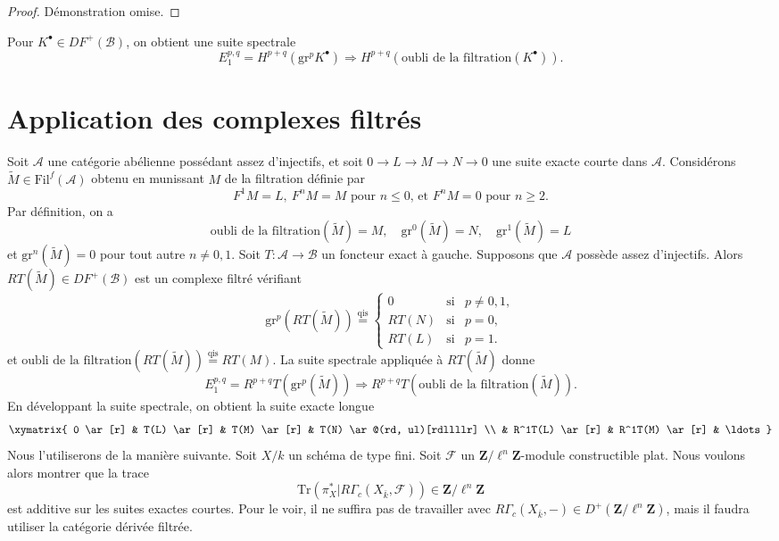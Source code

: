 \begin{proof}
Démonstration omise.
\end{proof}

\noindent
Pour $K^\bullet \in DF^+(\mathcal{B})$, on obtient une suite spectrale
$$
E_1^{p, q} = H^{p+q}(\text{gr}^p K^\bullet) \Rightarrow H^{p+q}(\text{oubli de la
filtration}(K^\bullet)).
$$






\section{Application des complexes filtrés}
\label{section-applications-filtered}

\noindent
Soit $\mathcal{A}$ une catégorie abélienne possédant assez d'injectifs, et soit
$0 \to L \to M \to N \to 0$ une suite exacte courte dans $\mathcal{A}$.
Considérons $\widetilde M \in \text{Fil}^f(\mathcal{A})$ obtenu en munissant $M$ de la
filtration définie par
$$
F^1M = L, \ F^nM = M
\text{ pour }n \leq 0\text{, et }F^nM = 0\text{ pour }n \geq 2.
$$
Par définition, on a
$$
\text{oubli de la filtration}(\widetilde M) = M, \quad
\text{gr}^0(\widetilde M) = N, \quad
\text{gr}^1(\widetilde M) = L
$$
et $\text{gr}^n(\widetilde M) = 0$ pour tout autre $n \neq 0, 1$. Soit $T:
\mathcal{A} \to \mathcal{B}$ un foncteur exact à gauche. Supposons que $\mathcal{A}$
possède assez d'injectifs. Alors $RT(\widetilde M) \in DF^+(\mathcal{B})$ est un
complexe filtré vérifiant
$$
\text{gr}^p(RT(\widetilde M))
\stackrel{\text{qis}}{=}
\left\{
\begin{matrix}
0 & \text{si} & p \neq 0, 1, \\
RT(N) & \text{si} & p = 0, \\
RT(L) & \text{si} & p = 1.
\end{matrix}
\right.
$$
et $\text{oubli de la filtration}(RT(\widetilde M))\stackrel{\text{qis}}{ = } RT(M)$. La
suite spectrale appliquée à $RT(\widetilde M)$ donne
$$
E_1^{p, q} = R^{p+q}T(\text{gr}^p(\widetilde M)) \Rightarrow
R^{p+q}T(\text{oubli de la filtration}(\widetilde M)).
$$
En développant la suite spectrale, on obtient la suite exacte longue
$$
\xymatrix{
0 \ar[r] & T(L) \ar[r] & T(M) \ar[r] & T(N) \ar@(rd, ul)[rdllllr] \\
& R^1T(L) \ar[r] & R^1T(M) \ar[r] & \ldots
}
$$
Nous l'utiliserons de la manière suivante. Soit $X/k$ un schéma de type fini. Soit
$\mathcal{F}$ un $\mathbf{Z}/\ell^n \mathbf{Z}$-module constructible plat.
Nous voulons alors montrer que la trace
$$
\text{Tr}( \pi_X^\ast | R\Gamma_c(X_{\bar k}, \mathcal{F})) \in
\mathbf{Z}/\ell^n \mathbf{Z}
$$
est additive sur les suites exactes courtes. Pour le voir, il ne suffira pas de
travailler avec $R\Gamma_c(X_{\bar k}, -) \in D^+(\mathbf{Z}/\ell^n \mathbf{Z})$, mais
il faudra utiliser la catégorie dérivée filtrée.







